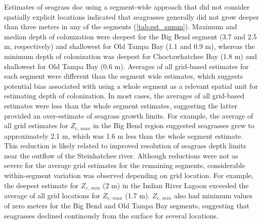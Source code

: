 \documentclass[letterpaper,12pt,oneside]{article}\usepackage[]{graphicx}\usepackage[]{color}
\begin{document}
Estimates of seagrass \ac{doc} using a segment-wide approach that did not consider spatially explicit locations indicated that seagrasses generally did not grow deeper than three meters in any of the segments (\cref{tab:est_summ}).  Maximum and median depth of colonization were deepest for the Big Bend segment (3.7 and 2.5 m, respectively) and shallowest for Old Tampa Bay (1.1 and 0.9 m), whereas the minimum depth of colonization was deepest for Choctawhatchee Bay (1.8 m) and shallowest for Old Tampa Bay (0.6 m).  Averages of all grid-based estimates for each segment were different than the segment wide estimates, which suggests potential bias associated with using a whole segment as a relevant spatial unit for estimating depth of colonization.  In most cases, the averages of all grid-based estimates were less than the whole segment estimates, suggesting the latter provided an over-estimate of seagrass growth limits.  For example, the average of all grid estimates for $Z_{c,\,max}$ in the Big Bend region suggested seagrasses grew to approximately 2.1 m, which was 1.6 m less than the whole segment estimate.  This reduction is likely related to improved resolution of seagrass depth limits near the outflow of the Steinhatchee river.  Although reductions were not as severe for the average grid estimates for the remaining segments, considerable within-segment variation was observed depending on grid location.  For example, the deepest estimate for $Z_{c,\,min}$ (2 m) in the Indian River Lagoon exceeded the average of all grid locations for $Z_{c,\,max}$ (1.7 m).  $Z_{c,\,min}$ also had minimum values of zero meters for the Big Bend and Old Tampa Bay segments, suggesting that seagrasses declined continously from the surface for several locations.   
\end{document}
